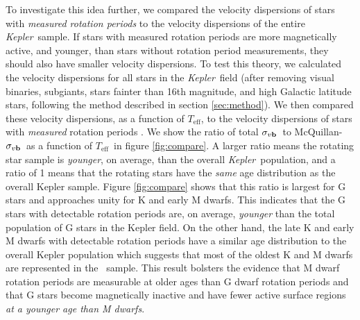 \documentclass{aastex63}
\newcommand{\ie}{{\it i.e.}}
\newcommand{\kepler}{{\it Kepler}}
\newcommand{\Kepler}{{\it Kepler}}
\newcommand{\teff}{$T_{\mathrm{eff}}$}
\newcommand{\sigmavb}{$\sigma_{v{\bf b}}$}
\newcommand{\mct}{\citet{mcquillan2014}}
\newcommand{\racomment}[1]{{\color{blue}#1}}
\begin{document}
\racomment{
    To investigate this idea further, we compared the velocity dispersions of
stars with {\it measured rotation periods} to the velocity dispersions of the
entire \kepler\ sample.
If stars with measured rotation periods are more magnetically active, and
younger, than stars without rotation period measurements, they should also
have smaller velocity dispersions.
To test this theory, we calculated the velocity dispersions for all stars in
the \kepler\ field (after removing visual binaries, subgiants, stars fainter
than 16th magnitude, and high Galactic latitude stars, following the method
described in section \ref{sec:method}).
We then compared these velocity dispersions, as a function of
\teff, to the velocity dispersions of stars with {\it measured} rotation
periods \citep[\ie\ stars that appear in table 1 of][]{mcquillan2014}.
We show the ratio of total \sigmavb\ to McQuillan-\sigmavb\ as a
function of \teff\ in figure \ref{fig:compare}.}
A larger ratio means the rotating star sample is {\it younger}, on average,
than the overall \Kepler\ population, and a ratio of 1 means that the rotating
stars have the {\it same} age distribution as the overall Kepler sample.
Figure \ref{fig:compare} shows that this ratio is largest for G stars and
approaches unity for K and early M dwarfs.
This indicates that the G stars with detectable rotation periods are, on
average, {\it younger} than the total population of G stars in the Kepler
field.
On the other hand, the late K and early M dwarfs with detectable rotation
periods have a similar age distribution to the overall Kepler population which
suggests that \racomment{most of} the oldest K and M dwarfs are represented in
the \mct\ sample.
This result bolsters the evidence that M dwarf rotation periods are measurable
at older ages than G dwarf rotation periods and that G stars become
magnetically inactive and have fewer active surface regions {\it at a younger
age than M dwarfs}.
\end{document}
